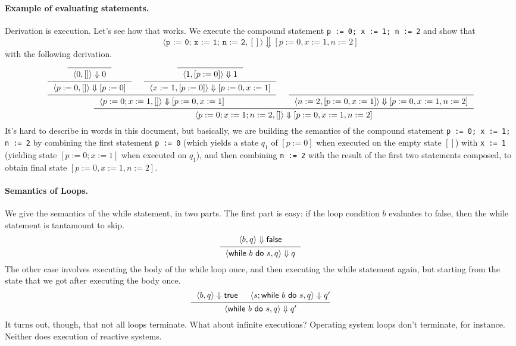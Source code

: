 \documentclass[11pt]{article}
\begin{document}
\paragraph{Example of evaluating statements.} Derivation is execution. Let's see how that works. We execute the compound statement \texttt{p := 0; x := 1; n := 2} and show that
\[ \langle \texttt{p := 0; x := 1; n := 2}, [] \rangle \Downarrow [p := 0, x := 1, n := 2] \]
with the following derivation.
{\small
\[
\begin{prooftree}
  \infer0{~~\langle 0, [] \rangle \Downarrow 0~~}
  \infer1{~~\langle p := 0, [] \rangle \Downarrow [p := 0]~~}
  \infer0{~~\langle 1, [p := 0]\rangle \Downarrow 1~~}
  \infer1{~~\langle x := 1, [p := 0] \rangle \Downarrow [p := 0, x := 1]~~}
  \infer2{~~\langle p:=0; x := 1, [] \rangle \Downarrow [p := 0, x := 1]~~}
  \infer0{~~\langle n := 2, [p := 0,x := 1] \rangle \Downarrow [p := 0, x := 1, n := 2]~~}
  \infer2{~~\langle p := 0; x := 1; n := 2, [] \rangle \Downarrow [p := 0,x:=1,n:=2]~~}
\end{prooftree}
\]
}
\noindent
It's hard to describe in words in this document, but basically, we are building the semantics of the compound statement \texttt{p := 0; x := 1; n := 2} by combining the first statement \texttt{p := 0} (which yields a state $q_1$ of $[p := 0]$ when executed on the empty state $[]$) with \texttt{x := 1} (yielding state $[p := 0; x := 1]$ when executed on $q_1$), and then combining \texttt{n := 2} with the result of the first two statements composed, to obtain final state $[p := 0,x:=1,n:=2]$.

\paragraph{Semantics of Loops.} We give the semantics of the \textsf{while} statement, in two parts. The first part is easy: if the loop condition $b$ evaluates to \textsf{false}, then the \textsf{while} statement is tantamount to \textsf{skip}.
\[
\begin{prooftree}
  \hypo{~~\langle b,q\rangle \Downarrow \mathsf{false}~~}
  \infer1{~~\langle \mathsf{while} ~b~ \mathsf{do} ~s,q\rangle \Downarrow q~~}
\end{prooftree}
\]
The other case involves executing the body of the while loop once, and then executing the while statement again, but starting from the state that we got after executing the body once.
\[
\begin{prooftree}
  \hypo{~~\langle b,q\rangle \Downarrow \mathsf{true}}
  \hypo{\langle s; \mathsf{while} ~b~ \mathsf{do} ~s, q\rangle \Downarrow q'}
  \infer2{~~\langle \mathsf{while} ~b~ \mathsf{do} ~s,q\rangle \Downarrow q'~~}
\end{prooftree}
\]
It turns out, though, that not all loops terminate. What about infinite executions? Operating system loops don't terminate, for instance. Neither does execution of reactive systems.
\end{document}
